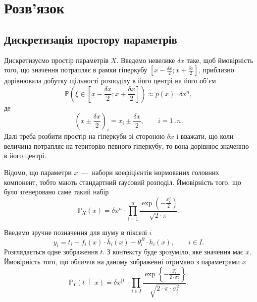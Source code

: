 \section{Розв'язок}

\vspace{-\baselineskip}

\subsection{Дискретизація простору параметрів}

Дискретизуємо простір параметрів $X$.
Введемо невелике $\delta x$ таке,
щоб ймовірність того, що значення потрапляє в рамки гіперкубу
$\left[ x - \frac{\delta x}{2}; x + \frac{\delta x}{2} \right]$,
приблизно дорівнювала добутку щільності розподілу в його центрі
на його об'єм
\begin{equation*}
  \mathbb{P}\left( \xi \in \left[ x - \frac{\delta x}{2};
                                  x + \frac{\delta x}{2} \right] \right)
  \approx p\left( x \right) \cdot \delta x^n,
\end{equation*}
де
\begin{equation*}
  \left( x \pm \frac{\delta x}{2} \right)_i = x_i \pm \frac{\delta x}{2},\qquad
  i = 1..n.
\end{equation*}
Далі треба розбити простір на гіперкуби
зі стороною $\delta x$ і вважати,
що коли величина потрапляє на територію певного гіперкубу,
то вона дорівнює значенню в його центрі.

Відомо, що параметри $x$~---~набори коефіцієнтів нормованих головних компонент,
тобто мають стандартний ґаусовий розподіл.
Ймовірність того, що було згенеровано саме такий набір
\begin{equation*}
  \mathbb{P}_X\left( x \right)
  = \delta x^n \cdot \prod_{i=1}^n
    \frac{\exp{\left( - \frac{x_i^2}{2} \right)}}{\sqrt{2 \cdot \pi}}.
\end{equation*}

Введемо зручне позначення для шуму в пікселі $i$
\begin{equation*}
  y_i
  = t_i
    - f_i\left( x \right) \cdot \overline{h}_i\left( x \right)
    - \theta_i^B \cdot h_i\left( x \right),\qquad
    i \in I.
\end{equation*}
Розглядається одне зображення $t$.
З контексту буде зрозуміло, яке значення має $x$.
Ймовірність того, що обличчя на даному зображенні отримано з параметрами $x$
\begin{equation*}
  \mathbb{P}_Y\left( t \;\middle|\; x \right)
  = \delta x^{\left| I \right|} \cdot \prod_{i \in I}
    \frac{\exp{\left\{- \frac{y_i^2}
           {2 \cdot \sigma^2_t} \right\}}}
           {\sqrt{2 \cdot \pi \cdot \sigma^2_t}}.
\end{equation*}

